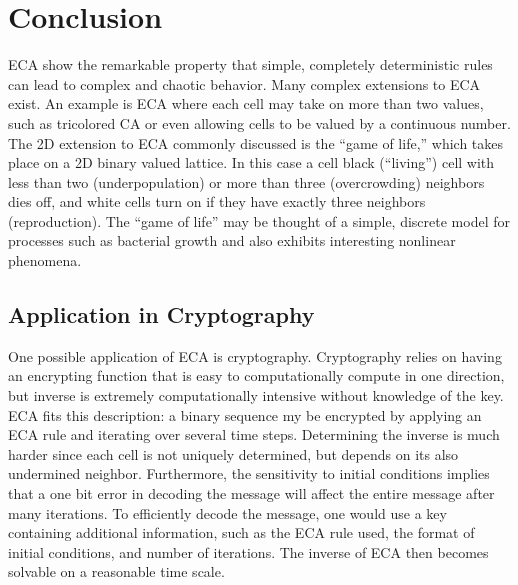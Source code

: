 \section{Conclusion}

ECA show the remarkable property that simple, completely deterministic rules can lead to complex and chaotic behavior.  Many complex extensions to ECA exist.  An example is ECA where each cell may take on more than two values, such as tricolored CA or even allowing cells to be valued by a continuous number.  The 2D extension to ECA commonly discussed is the “game of life,” which takes place on a 2D binary valued lattice.  In this case a cell black (“living”) cell with less than two (underpopulation) or more than three (overcrowding) neighbors dies off, and white cells turn on if they have exactly three neighbors (reproduction).  The “game of life” may be thought of a simple, discrete model for processes such as bacterial growth and also exhibits interesting nonlinear phenomena.  

\subsection{Application in Cryptography}

One possible application of ECA is cryptography.  Cryptography relies on having an encrypting function that is easy to computationally compute in one direction, but inverse is extremely computationally intensive without knowledge of the key.  ECA fits this description: a binary sequence my be encrypted by applying an ECA rule and iterating over several time steps.  Determining the inverse is much harder since each cell is not uniquely determined, but depends on its also undermined neighbor.  Furthermore, the sensitivity to initial conditions implies that a one bit error in decoding the message will affect the entire message after many iterations.  To efficiently decode the message, one would use a key containing additional information, such as the ECA rule used, the format of initial conditions, and number of iterations.  The inverse of ECA then becomes solvable on a reasonable time scale.  

